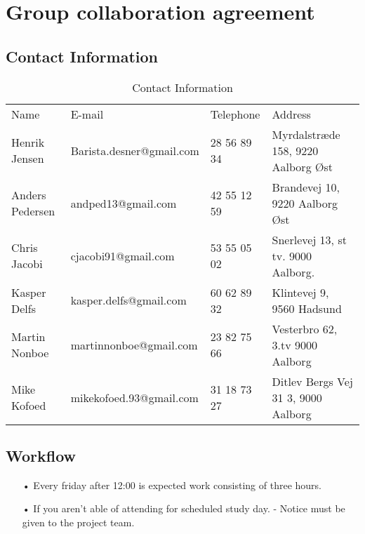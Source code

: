 \section{Group collaboration agreement}
\subsection{Contact Information}
\begin{table}[h]
\centering
\label{contactinfo}
\begin{tabular}{l|l|l|p{4cm}}
\rowcolor[HTML]{4BACC6} 
{\color[HTML]{FFFFFF} Name} & {\color[HTML]{FFFFFF} E-mail} & {\color[HTML]{FFFFFF} Telephone} & {\color[HTML]{FFFFFF} Address}       \\
Henrik Jensen               & Barista.desner@gmail.com      & 28 56 89 34                      & Myrdalstræde 158, 9220 Aalborg Øst   \\
\rowcolor[HTML]{D2EAF1} 
Anders Pedersen             & andped13@gmail.com            & 42 55 12 59                      & Brandevej 10, 9220 Aalborg Øst     \\
Chris Jacobi                & cjacobi91@gmail.com           & 53 55 05 02                      & Snerlevej 13, st tv. 9000 Aalborg.   \\
\rowcolor[HTML]{D2EAF1} 
Kasper Delfs                & kasper.delfs@gmail.com        & 60 62 89 32                      & Klintevej 9, 9560 Hadsund            \\
Martin Nonboe               & martinnonboe@gmail.com        & 23 82 75 66                      & Vesterbro 62, 3.tv 9000 Aalborg      \\
\rowcolor[HTML]{D2EAF1} 
Mike Kofoed                 & mikekofoed.93@gmail.com       & 31 18 73 27                      & Ditlev Bergs Vej 31 3, 9000 Aalborg
\end{tabular}
\caption{Contact Information}
\end{table}

\subsection{Workflow}
\begin{enumerate}
	\item[•]Every friday after 12:00 is expected work consisting of three hours.   
	\item[•]If you aren’t able of attending for scheduled study day. - Notice must be given to the project team. 
\end{enumerate}

